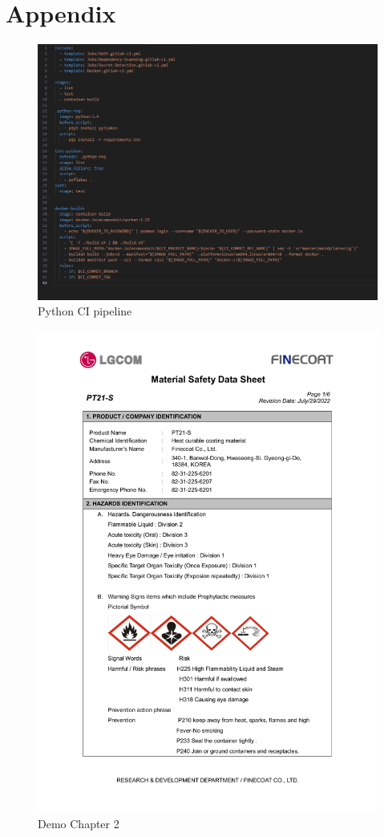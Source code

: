 \documentclass[a4paper,12pt,twoside]{report}
\begin{document}
\chapter{Appendix}\label{appendix}
\begin{figure}[H]
		\includegraphics[width=\textwidth, keepaspectratio ]{images/python-yaml}
	\caption[pythonPipe]{Python CI pipeline}
\label{Python Pipeline}
\end{figure}	
\begin{figure}[H]
		\includegraphics[width=\textwidth, keepaspectratio]{images/chaps1}
	\caption[chaps123]{Demo Chapter 2}
\label{chaps1}
\end{figure}
\end{document}
